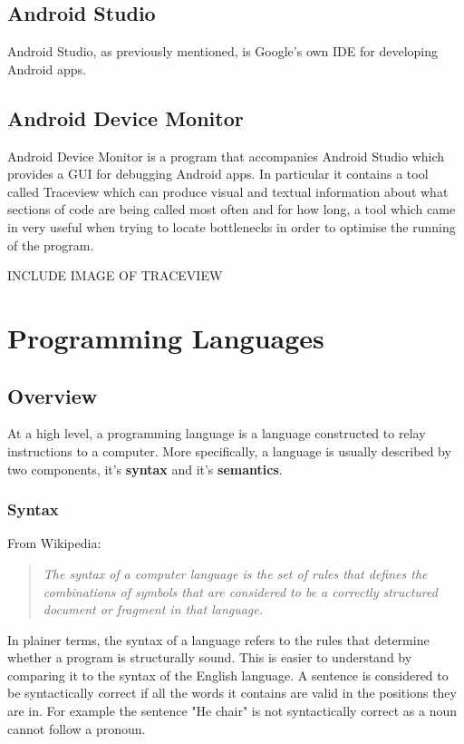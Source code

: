\documentclass[ %
                    author={Jonathan Rankin},
                supervisor={Dr. David May, Dr. Ian Holyer},
                    degree={MEng},
                     title={CodeTouch},
                  subtitle={A Revolutionary Way To Program Real Code On Touch Screen Devices},
                      type={enterprise},
                      year={2015 } ]{dissertation}
\begin{document}
\subsection{Android Studio}
Android Studio, as previously mentioned, is Google's own IDE for developing Android apps. 


\subsection{Android Device Monitor}
Android Device Monitor is a program that accompanies Android Studio which provides a GUI for debugging Android apps. In particular it contains a tool called Traceview which can produce visual and textual information about what sections of code are being called most often and for how long, a tool which came in very useful when trying to locate bottlenecks in order to optimise the running of the program.

INCLUDE IMAGE OF TRACEVIEW

\section{Programming Languages}


\subsection{Overview}
At a high level, a programming language is a language constructed to relay instructions to a computer. More specifically, a language is usually described by two components, it's \textbf{syntax} and it's \textbf{semantics}.

\subsubsection{Syntax}
From Wikipedia:

\begin{quote}

\textit{The syntax of a computer language is the set of rules that defines the combinations of symbols that are considered to be a correctly structured document or fragment in that language.}
\end{quote}

In plainer terms, the syntax of a language refers to the rules that determine whether a program is structurally sound. This is easier to understand by comparing it to the syntax of the English language. A sentence is considered to be syntactically correct if all the words it contains are valid in the positions they are in. For example the sentence "He chair" is not syntactically correct as a noun cannot follow a pronoun.
\end{document}
